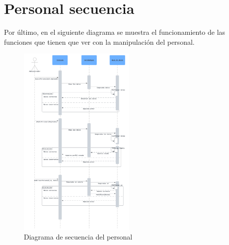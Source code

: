 \pagebreak

\section{Personal secuencia}

Por último, en el siguiente diagrama se muestra el funcionamiento de las funciones que tienen que ver con la manipulación del personal.

\begin{figure}[h]
    \centering
    \includegraphics[width=0.5\textwidth]{figures/personal-secuencia.png}
    \caption{Diagrama de secuencia del personal}
    \label{fig:elementos}
\end{figure}
